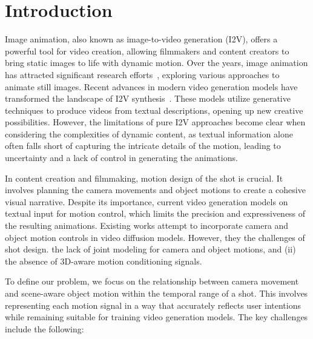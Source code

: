 

\section{Introduction}
\label{sec-1-intro}

Image animation, also known as image-to-video generation (I2V), offers a powerful tool for video creation, allowing filmmakers and content creators 
to bring static images to life with dynamic motion. 
Over the years, image animation has attracted significant research efforts~\cite{horrytour, xuanimating,niklaus3d,liuinfinite, holynski2021animating}, exploring various approaches to animate still images.
Recent advances in modern video generation models have transformed the landscape of I2V 
synthesis~\cite{xing2023dynamicrafter,yang2024cogvideox}. These models utilize generative techniques 
to produce videos from textual descriptions, opening up new creative possibilities. However, the limitations of pure I2V approaches become clear when considering the complexities of dynamic content, as textual information alone often falls short of 
capturing the intricate details of the motion, leading to uncertainty and a lack of control in generating the animations.

In content creation and filmmaking, motion design of the shot is crucial. It involves planning the camera movements and object motions to create a cohesive visual narrative. Despite its importance, current video generation models  on textual input for motion control, which  limits the precision and expressiveness of the resulting animations.  Existing works  attempt to incorporate camera and object motion controls in video diffusion models.
However, they  
the challenges of shot design.
 the lack of joint modeling for camera and object motions, and (ii) the absence of 3D-aware motion conditioning signals.


To define our problem, we focus on the relationship between camera movement and scene-aware object motion within the temporal range of a shot. This involves representing each motion signal in a way that accurately reflects user intentions while remaining suitable for training video generation models. The key challenges include the following:

